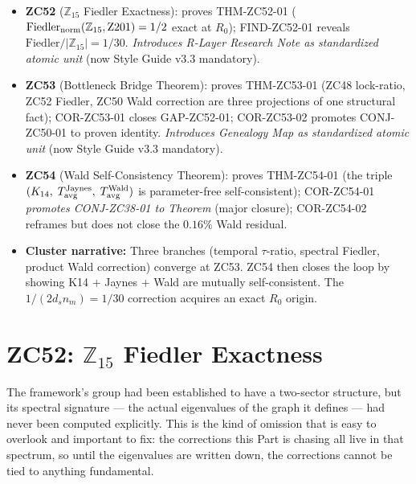 \documentclass[12pt, a4paper]{article}
\begin{document}
\begin{keybox}[title={Part XXXIX Overview}]
\begin{itemize}[leftmargin=1.5em]
\item \textbf{ZC52} ($\mathbb{Z}_{15}$ Fiedler Exactness): proves
  THM-ZC52-01 ($\mathrm{Fiedler}_{\rm norm}(\mathbb{Z}_{15},\mathrm{Z201})=1/2$
  exact at $R_0$); FIND-ZC52-01 reveals
  $\mathrm{Fiedler}/|\mathbb{Z}_{15}|=1/30$.
  \emph{Introduces R-Layer Research Note as standardized atomic
  unit} (now Style Guide v3.3 mandatory).
\item \textbf{ZC53} (Bottleneck Bridge Theorem): proves
  THM-ZC53-01 (ZC48 lock-ratio, ZC52 Fiedler, ZC50 Wald correction
  are three projections of one structural fact);
  COR-ZC53-01 closes GAP-ZC52-01;
  COR-ZC53-02 promotes CONJ-ZC50-01 to proven identity.
  \emph{Introduces Genealogy Map as standardized atomic unit}
  (now Style Guide v3.3 mandatory).
\item \textbf{ZC54} (Wald Self-Consistency Theorem): proves
  THM-ZC54-01 (the triple
  $(K_{14},\;T_{\rm avg}^{\rm Jaynes},\;T_{\rm avg}^{\rm Wald})$
  is parameter-free self-consistent); COR-ZC54-01 \emph{promotes
  CONJ-ZC38-01 to Theorem} (major closure); COR-ZC54-02 reframes
  but does not close the $0.16\%$ Wald residual.
\item \textbf{Cluster narrative:}
  Three branches (temporal $\tau$-ratio, spectral Fiedler, product
  Wald correction) converge at ZC53. ZC54 then closes the loop
  by showing K14 + Jaynes + Wald are mutually self-consistent.
  The $1/(2d_s n_m)=1/30$ correction acquires an exact $R_0$ origin.
\end{itemize}
\end{keybox}



\section{ZC52: $\mathbb{Z}_{15}$ Fiedler Exactness}

The framework's group had been established to have a two-sector structure, but
its spectral signature --- the actual eigenvalues of the graph it defines --- had
never been computed explicitly. This is the kind of omission that is easy to
overlook and important to fix: the corrections this Part is chasing all live in
that spectrum, so until the eigenvalues are written down, the corrections cannot
be tied to anything fundamental.
\end{document}
